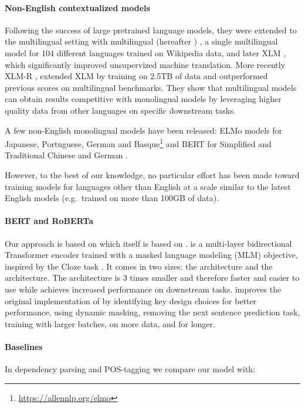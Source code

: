 \paragraph{Non-English contextualized models}
\label{contextualmodelsforotherlanguages}
Following the success of large pretrained language models, they were extended to the multilingual setting with multilingual \bert (hereafter \mbert) \cite{devlin-etal-2019-bert}, a single multilingual model for 104 different languages trained on Wikipedia data, and later XLM \cite{conneau-lample-2019-cross}, which significantly improved unsupervized machine translation.
More recently XLM-R \cite{conneau-etal-2020-unsupervised}, extended XLM by training on 2.5TB of data and outperformed previous scores on multilingual benchmarks. They show that multilingual models can obtain results competitive with monolingual models by leveraging higher quality data from other languages on specific downstream tasks.

A few non-English monolingual models have been released: ELMo models for Japanese, Portuguese, German and Basque\footnote{\url{https://allennlp.org/elmo}} and BERT for Simplified and Traditional Chinese \cite{devlin-etal-2019-bert} and German \cite{chan-etal-2019-german}.

However, to the best of our knowledge, no particular effort has been made toward training models for languages other than English at a scale similar to the latest English models (e.g.~\roberta trained on more than 100GB of data).

\paragraph{BERT and RoBERTa}
Our approach is based on \roberta \cite{liu-etal-2019-roberta} which itself is based on \bert \cite{devlin-etal-2019-bert}.
\bert is a multi-layer bidirectional Transformer encoder trained with a masked language modeling (MLM) objective, inspired by the Cloze task \cite{taylor-1953-cloze}.
It comes in two sizes: the \bertbase architecture and the \bertlarge architecture. The \bertbase architecture is 3 times smaller and therefore faster and easier to use while \bertlarge achieves increased performance on downstream tasks.
\roberta improves the original implementation of \bert by identifying key design choices for better performance, using dynamic masking, removing the next sentence prediction task, training with larger batches, on more data, and for longer.

\paragraph{Baselines}
In dependency parsing and POS-tagging we compare our model with:

